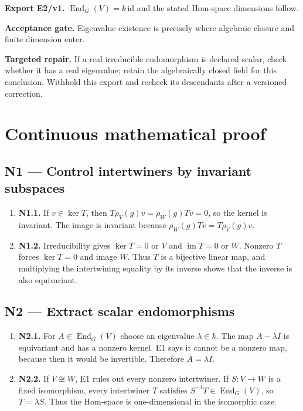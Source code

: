 \documentclass[preprint,12pt,aps,pra,showkeys,amsmath,amssymb,superscriptaddress,floatfix]{revtex4-2}
\theoremstyle{definition}
\theoremstyle{remark}
\newcommand{\field}[2]{\par\smallskip\noindent\textbf{#1.} #2\par}
\begin{document}
\field{Export E2/v1}{\(\operatorname{End}_G(V)=k\,\mathrm{id}\) and the stated Hom-space
dimensions follow.}

\field{Acceptance gate}{Eigenvalue existence is precisely where algebraic closure and finite
dimension enter.}

\field{Targeted repair}{If a real irreducible endomorphism is declared scalar, check whether it
has a real eigenvalue; retain the algebraically closed field for this
conclusion. Withhold this export and recheck its descendants after a
versioned correction.}

\endgroup\clearpage\section{Continuous mathematical proof}\label{sec:proof}

\subsection{N1 --- Control intertwiners by invariant
subspaces}\label{n1-control-intertwiners-by-invariant-subspaces}

\begin{enumerate}
\def\labelenumi{\arabic{enumi}.}
\item
  \textbf{N1.1.} If \(v\in\ker T\), then \(T\rho_V(g)v=\rho_W(g)Tv=0\),
  so the kernel is invariant. The image is invariant because
  \(\rho_W(g)Tv=T\rho_V(g)v\).
\item
  \textbf{N1.2.} Irreducibility gives \(\ker T=0\) or \(V\) and
  \(\operatorname{im}T=0\) or \(W\). Nonzero \(T\) forces \(\ker T=0\)
  and image \(W\). Thus \(T\) is a bijective linear map, and multiplying
  the intertwining equality by its inverse shows that the inverse is
  also equivariant.
\end{enumerate}

\subsection{N2 --- Extract scalar
endomorphisms}\label{n2-extract-scalar-endomorphisms}

\begin{enumerate}
\def\labelenumi{\arabic{enumi}.}
\item
  \textbf{N2.1.} For \(A\in\operatorname{End}_G(V)\) choose an
  eigenvalue \(\lambda\in k\). The map \(A-\lambda I\) is equivariant
  and has a nonzero kernel. E1 says it cannot be a nonzero map, because
  then it would be invertible. Therefore \(A=\lambda I\).
\item
  \textbf{N2.2.} If \(V\not\cong W\), E1 rules out every nonzero
  intertwiner. If \(S:V\to W\) is a fixed isomorphism, every intertwiner
  \(T\) satisfies \(S^{-1}T\in\operatorname{End}_G(V)\), so
  \(T=\lambda S\). Thus the Hom-space is one-dimensional in the
  isomorphic case.
\end{enumerate}
\end{document}
